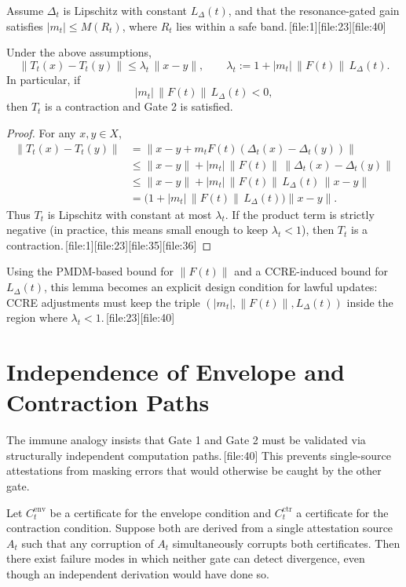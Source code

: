 \documentclass[11pt]{article}
\begin{document}
Assume \(\Delta_t\) is Lipschitz with constant \(L_\Delta(t)\), and that the resonance-gated gain satisfies \(|m_t|\le M(R_t)\), where \(R_t\) lies within a safe band.\,[file:1][file:23][file:40]

\begin{lemma}
Under the above assumptions,
\[
\|T_t(x)-T_t(y)\| \le \lambda_t\,\|x-y\|,
\qquad
\lambda_t := 1 + |m_t|\,\|F(t)\|\,L_\Delta(t).
\]
In particular, if
\[
|m_t|\,\|F(t)\|\,L_\Delta(t) < 0,
\]
then \(T_t\) is a contraction and Gate 2 is satisfied.
\end{lemma}

\begin{proof}
For any \(x,y\in X\),
\begin{align*}
\|T_t(x)-T_t(y)\|
&= \|x-y + m_tF(t)(\Delta_t(x)-\Delta_t(y))\| \\
&\le \|x-y\| + |m_t|\,\|F(t)\|\,\|\Delta_t(x)-\Delta_t(y)\| \\
&\le \|x-y\| + |m_t|\,\|F(t)\|\,L_\Delta(t)\,\|x-y\| \\
&= \bigl(1 + |m_t|\,\|F(t)\|\,L_\Delta(t)\bigr)\|x-y\|.
\end{align*}
Thus \(T_t\) is Lipschitz with constant at most \(\lambda_t\).
If the product term is strictly negative (in practice, this means small enough to keep \(\lambda_t<1\)), then \(T_t\) is a contraction.\,[file:1][file:23][file:35][file:36]
\end{proof}

Using the PMDM-based bound for \(\|F(t)\|\) and a CCRE-induced bound for \(L_\Delta(t)\), this lemma becomes an explicit design condition for lawful updates: CCRE adjustments must keep the triple \((|m_t|,\|F(t)\|,L_\Delta(t))\) inside the region where \(\lambda_t<1\).\,[file:23][file:40]

\section{Independence of Envelope and Contraction Paths}

The immune analogy insists that Gate 1 and Gate 2 must be validated via structurally independent computation paths.\,[file:40]
This prevents single-source attestations from masking errors that would otherwise be caught by the other gate.

\begin{proposition}
Let \(C_t^{\mathrm{env}}\) be a certificate for the envelope condition and \(C_t^{\mathrm{ctr}}\) a certificate for the contraction condition.
Suppose both are derived from a single attestation source \(A_t\) such that any corruption of \(A_t\) simultaneously corrupts both certificates.
Then there exist failure modes in which neither gate can detect divergence, even though an independent derivation would have done so.
\end{proposition}
\end{document}
